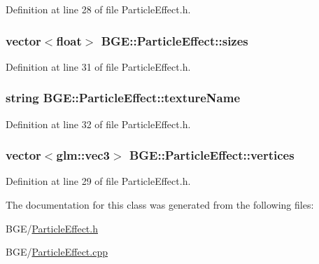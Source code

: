 Definition at line 28 of file Particle\-Effect.\-h.

\hypertarget{class_b_g_e_1_1_particle_effect_ae2034369c584704fd27592e481e94c5b}{
\subsubsection[{sizes}]{\setlength{\rightskip}{0pt plus 5cm}vector$<$float$>$ B\-G\-E\-::\-Particle\-Effect\-::sizes}}\label{class_b_g_e_1_1_particle_effect_ae2034369c584704fd27592e481e94c5b}


Definition at line 31 of file Particle\-Effect.\-h.

\hypertarget{class_b_g_e_1_1_particle_effect_a7dbe5e230bce0d13d37d82c236188440}{
\subsubsection[{texture\-Name}]{\setlength{\rightskip}{0pt plus 5cm}string B\-G\-E\-::\-Particle\-Effect\-::texture\-Name}}\label{class_b_g_e_1_1_particle_effect_a7dbe5e230bce0d13d37d82c236188440}


Definition at line 32 of file Particle\-Effect.\-h.

\hypertarget{class_b_g_e_1_1_particle_effect_a2cd0cf7b9c82de0a3fadf4ffb0c98944}{
\subsubsection[{vertices}]{\setlength{\rightskip}{0pt plus 5cm}vector$<$glm\-::vec3$>$ B\-G\-E\-::\-Particle\-Effect\-::vertices}}\label{class_b_g_e_1_1_particle_effect_a2cd0cf7b9c82de0a3fadf4ffb0c98944}


Definition at line 29 of file Particle\-Effect.\-h.



The documentation for this class was generated from the following files\-:\begin{DoxyCompactItemize}
\item 
B\-G\-E/\hyperlink{_particle_effect_8h}{Particle\-Effect.\-h}\item 
B\-G\-E/\hyperlink{_particle_effect_8cpp}{Particle\-Effect.\-cpp}\end{DoxyCompactItemize}

